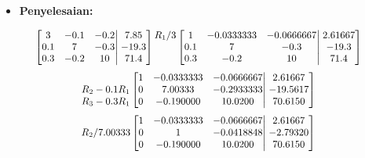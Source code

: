 \documentclass[pdflatex,compress,mathserif]{beamer}
\newcommand*{\Scale}[2][4]{\scalebox{#1}{$#2$}}%
\begin{document}
\begin{frame}
	\begin{itemize}
		\item \textbf{Penyelesaian:}
	\end{itemize}
	\[
	\Scale[0.9]{
	\left[
		\begin{matrix}
			3 & -0.1 & -0.2 \\
			0.1 & 7 & -0.3 \\
			0.3 & -0.2 & 10
		\end{matrix}
	\right|
	\left.
		\begin{matrix}
			7.85 \\ -19.3 \\ 71.4
		\end{matrix}
	\right]
	\begin{matrix}
		R_1 / 3\\
		\\
		\\
	\end{matrix}
	\left[
		\begin{matrix}
			1 & -0.0333333 & -0.0666667 \\
			0.1 & 7 & -0.3 \\
			0.3 & -0.2 & 10
		\end{matrix}
	\right|
	\left.
		\begin{matrix}
			2.61667 \\ -19.3 \\ 71.4
		\end{matrix}
	\right]
	}
	\]
	\[
	\Scale[0.9]{
	\begin{matrix}
		\\
		R_2 - 0.1R_1\\
		R_3 - 0.3R_1
	\end{matrix}
	\left[
		\begin{matrix}
			1 & -0.0333333 & -0.0666667 \\
			0 & 7.00333 & -0.2933333 \\
			0 & -0.190000 & 10.0200
		\end{matrix}
	\right|
	\left.
		\begin{matrix}
			2.61667 \\ -19.5617 \\ 70.6150
		\end{matrix}
	\right]
	}
	\]
	\[
	\Scale[0.9]{
		\begin{matrix}
		\\
		R_2 /7.00333\\
		\\
		\end{matrix}
		\left[
		\begin{matrix}
		1 & -0.0333333 & -0.0666667 \\
		0 & 1 & -0.0418848 \\
		0 & -0.190000 & 10.0200
		\end{matrix}
		\right|
		\left.
		\begin{matrix}
		2.61667 \\ -2.79320 \\ 70.6150
		\end{matrix}
		\right]
	}
	\]
\end{frame}
\end{document}
